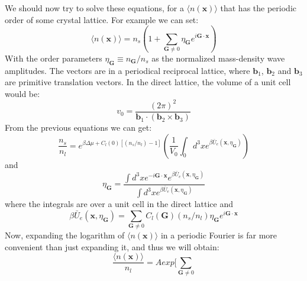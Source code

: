\documentclass[12pt,a4paper]{article}
\begin{document}
We should now try to solve these equations, for a  $\langle n(\textbf{x})\rangle$ that has the periodic order of some crystal lattice. For example we can set:
\begin{equation}
\langle n(\textbf{x})\rangle = n_s (1+\sum_{\textbf{G} \neq 0} \eta_{\textbf{G}} e^{i \textbf{G} \cdot \textbf{x}})
\end{equation}
With  the order parameters $\eta_{\textbf{G}}\equiv n_{\textbf{G}}/n_s$ as the normalized mass-density wave amplitudes. The vectors are in a periodical reciprocal lattice, where $\textbf{b}_1$, $\textbf{b}_2$ and $\textbf{b}_3$ are primitive translation vectors. In the direct lattice, the volume of a unit cell would be:
\begin{equation}
v_0=\frac{(2\pi)^2}{\textbf{b}_1 \cdot (\textbf{b}_2 \times \textbf{b}_3)}
\end{equation}
From the previous equations we can get:
\begin{equation}
\frac{n_s}{n_l} = e^{\beta \Delta \mu + C_l (0) [ ( n_s /n_l ) -1 ]} 
( \frac{1}{V_0}
\int_0 d^3 x e^{ \beta \bar{U}_e (\textbf{x},\eta_{\textbf{G}} ) } )
\end{equation}
and
\begin{equation}
\eta_{\textbf{G}} = \frac{
\int d^3 x e^{- i \textbf{G} \cdot \textbf{x} }
e^{ \beta \bar{U}_e (\textbf{x},\eta_{\textbf{G}} ) }}
{\int d^3 x e^{ \beta \bar{U}_e (\textbf{x},\eta_{\textbf{G}} ) }}
\end{equation}
where the integrals are over a unit cell in the direct lattice and
\begin{equation}
\beta \bar{U}_e (\textbf{x},\eta_{\textbf{G}} ) = \sum_{\textbf{G}\neq 0} 
C_l(\textbf{G}) ( n_s / n_l ) \eta_{\textbf{G}} e^{i \textbf{G} \cdot \textbf{x}}
\end{equation}
Now, expanding the logarithm of $\langle n(\textbf{x})\rangle$ in a periodic Fourier is far more convenient than just expanding it, and thus we will obtain:
\begin{equation}
\frac{\langle n(\textbf{x})\rangle}{n_l} = A exp [ \sum_{\textbf{G}\neq 0} 
\end{equation}
\end{document}
